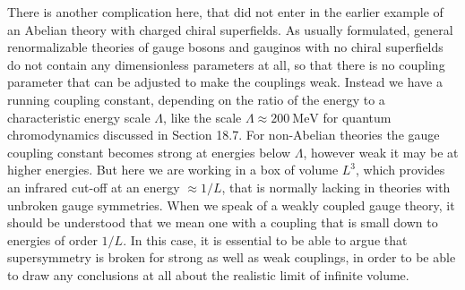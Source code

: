 There is another complication here, that did not enter in the earlier
example of an Abelian theory with charged chiral superfields. As usually
formulated, general renormalizable theories of gauge bosons and gauginos
with no chiral superfields do not contain any dimensionless parameters at
all, so that there is no coupling parameter that can be adjusted to make the
couplings weak. Instead we have a running coupling constant, depending on
the ratio of the energy to a characteristic energy scale \(\Lambda\), like
the scale \(\Lambda\approx200\ \mathrm{MeV}\) for quantum chromodynamics
discussed in Section 18.7. For non-Abelian theories the gauge coupling
constant becomes strong at energies below \(\Lambda\), however weak it may
be at higher energies. But here we are working in a box of volume \(L^3\),
which provides an infrared cut-off at an energy \(\approx1/L\), that is
normally lacking in theories with unbroken gauge symmetries. When we speak
of a weakly coupled gauge theory, it should be understood that we mean one
with a coupling that is small down to energies of order \(1/L\). In this
case, it is essential to be able to argue that supersymmetry is broken for
strong as well as weak couplings, in order to be able to draw any
conclusions at all about the realistic limit of infinite volume.

